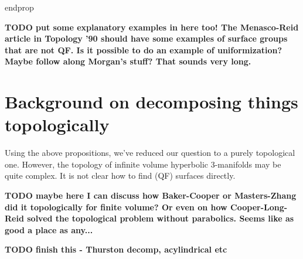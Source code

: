endprop

\textbf{ TODO put some explanatory examples in here too! The Menasco-Reid
article in Topology '90 should have some examples of surface groups that are
not QF. Is it possible to do an example of uniformization? Maybe follow along
Morgan's stuff? That sounds very long. }

\section{Background on decomposing things topologically}

Using the above propositions, we've reduced our question to a purely
topological one. However, the topology of infinite volume hyperbolic
3-manifolds may be quite complex. It is not clear how to find (QF) surfaces
directly.

\textbf{ TODO maybe here I can discuss how Baker-Cooper or Masters-Zhang did it
topologically for finite volume? Or even on how Cooper-Long-Reid solved the
topological problem without parabolics. Seems like as good a place as any...}


\textbf{TODO finish this - Thurston decomp, acylindrical etc}

